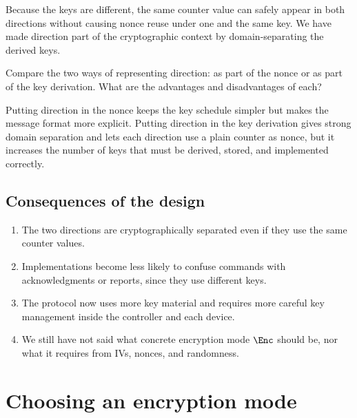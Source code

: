 Because the keys are different, the same counter value can safely appear in
both directions without causing nonce reuse under one and the same key.
We have made direction part of the cryptographic context by domain-separating
the derived keys.

\begin{exercise}
  Compare the two ways of representing direction:
  as part of the nonce or as part of the key derivation.
  What are the advantages and disadvantages of each?
\end{exercise}

Putting direction in the nonce keeps the key schedule simpler but makes the
message format more explicit.
Putting direction in the key derivation gives strong domain separation and
lets each direction use a plain counter as nonce, but it increases the number
of keys that must be derived, stored, and implemented correctly.

\subsection{Consequences of the design}

\begin{enumerate}
  \item The two directions are cryptographically separated even if they use
    the same counter values.
  \item Implementations become less likely to confuse commands with
    acknowledgments or reports, since they use different keys.
  \item The protocol now uses more key material and requires more careful key
    management inside the controller and each device.
  \item We still have not said what concrete encryption mode
    \(\Enc\) should be, nor what it requires from IVs, nonces, and
    randomness.
\end{enumerate}


\section{Choosing an encryption mode}
\label{EnergyEncryptionMode}


